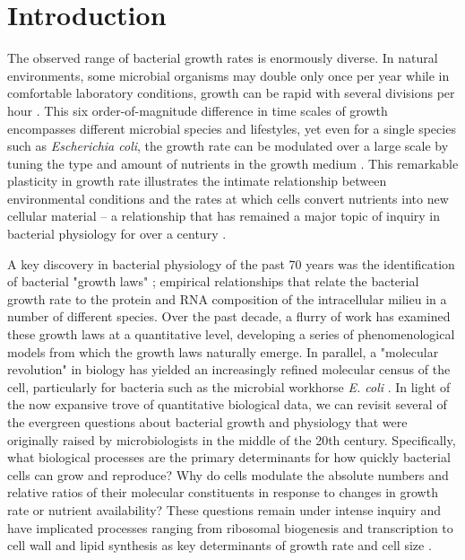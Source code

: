 
\section{Introduction}
The observed range of bacterial growth rates is enormously diverse. In natural
environments, some microbial organisms may double only once per year
\citep{mikucki2009} while in comfortable laboratory conditions, growth can be
rapid with several divisions per hour \citep{schaechter1958}. This six
order-of-magnitude difference in time scales of growth encompasses different
microbial species and lifestyles, yet even for a single species such as
\textit{Escherichia coli}, the growth rate can be modulated over a
large scale by tuning the type and amount of nutrients in the growth medium
\citep{liu2005a}. This remarkable plasticity in growth rate illustrates the
intimate relationship between environmental conditions and the rates at which
cells convert nutrients into new cellular material -- a relationship that has
remained a major topic of inquiry in bacterial physiology for over a century
\citep{jun2018}.

A key discovery in bacterial physiology of the past 70 years was the
identification of bacterial "growth laws" \citep{schaechter1958}; empirical
relationships that relate the bacterial growth rate to the protein and RNA
composition of the intracellular milieu in a number of different species. Over
the past decade, a flurry of work \citep{molenaar2009, scott2010, klumpp2014,
basan2015, dai2016, erickson2017} has examined these growth laws at a
quantitative level, developing a series of phenomenological models from which
the growth laws naturally emerge. In parallel, a "molecular revolution" in
biology has yielded an increasingly refined molecular census of the cell,
particularly for bacteria such as the microbial workhorse \textit{E. coli}
\citep{schmidt2016, davidi2016a}. In light of the now expansive trove of
quantitative biological data, we can revisit several of the evergreen questions
about bacterial growth and physiology that were originally raised by
microbiologists in the middle of the 20th century. Specifically, what biological
processes are the primary determinants for how quickly bacterial cells can grow
and reproduce? Why do cells modulate the absolute numbers and relative ratios of
their molecular constituents in response to changes in growth rate or nutrient
availability? These questions remain under intense inquiry and have implicated
processes ranging from ribosomal biogenesis and transcription to cell wall and
lipid synthesis as key determinants of growth rate and cell size
\citep{bremer2008, scott2010, si2017, vadia2017, harris2018, Buke2020, zhang2020}.

